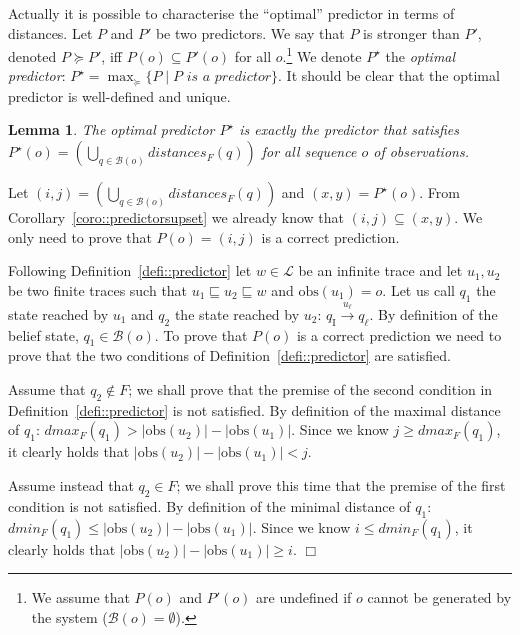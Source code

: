 \documentclass{article}
\newtheorem{lemm}{Lemma}
\newenvironment{proof}{\par\noindent{\bf Proof}}{\hspace{\stretch{1}}$\Box$}
\newcommand{\prefix}{\sqsubseteq}
\newcommand{\qi}[0]{q_{\mathrm{I}}}
\newcommand{\trans}[1]{\stackrel{#1}{\rightarrow}}
\newcommand{\lang}[0]{\mathcal{L}}
\newcommand{\obs}[0]{\mathrm{obs}}
\newcommand{\dmin}[1]{\mathit{dmin}_{#1}}
\newcommand{\dmax}[1]{\mathit{dmax}_{#1}}
\newcommand{\distances}{\mathit{distances}_F}
\newcommand{\belief}{\mathcal{B}}
\newcommand{\optimal}[1]{{#1}^\star}
\newcommand{\optipred}{\optimal{P}}
\newcommand{\set}[1]{\{#1\}}
\begin{document}
Actually it is possible to characterise 
the ``optimal'' predictor in terms of distances.  
Let $P$ and $P'$ be two predictors.  
We say that $P$ is stronger than $P'$, denoted $P \succeq P'$, 
iff $P(o) \subseteq P'(o)$ for all $o$.\footnote{We assume that $P(o)$ and $P'(o)$ 
are undefined if $o$ cannot be generated by the system 
($\belief(o) = \emptyset$).}
We denote $\optipred$ the \emph{optimal predictor}: 
$\optipred = \max_\succeq \set{P \mid P \textit{ is a predictor}}$.  
It should be clear that the optimal predictor is well-defined and unique.  

\begin{lemm}\label{lemm::defopti}
  The optimal predictor $\optipred$ 
  is exactly the predictor that satisfies $\optipred(o) = 
  \left(\bigcup_{q \in \belief(o)} \distances(q) \right)$ 
  for all sequence $o$ of observations.  
\end{lemm}

\begin{proof}
  Let $(i,j) = \left(\bigcup_{q \in \belief(o)} \distances(q) \right)$ 
  and $(x,y) = \optipred(o)$.  
  From Corollary~\ref{coro::predictorsupset} 
  we already know that $(i,j) \subseteq (x,y)$.  
  We only need to prove that $P(o) = (i,j)$ 
  is a correct prediction.  

  Following Definition~\ref{defi::predictor} 
  let $w \in \lang$ be an infinite trace 
  and let $u_1,u_2$ be two finite traces 
  such that $u_1 \prefix u_2 \prefix w$ and $\obs(u_1) = o$.  
  Let us call $q_1$ the state reached by $u_1$ 
  and $q_2$ the state reached by $u_2$: 
  $\qi \trans{u_\ell} q_\ell$.  
  By definition of the belief state, $q_1 \in \belief(o)$.  
  To prove that $P(o)$ is a correct prediction 
  we need to prove that the two conditions 
  of Definition~\ref{defi::predictor} are satisfied.  

  Assume that $q_2 \not\in F$; 
  we shall prove that the premise of the second condition 
  in Definition~\ref{defi::predictor} is not satisfied.  
  By definition of the maximal distance of $q_1$: 
  $\dmax{F}(q_1) > |\obs(u_2)| - |\obs(u_1)|$.  
  Since we know $j \ge \dmax{F}(q_1)$, it clearly holds 
  that $|\obs(u_2)| - |\obs(u_1)| < j$.  

  Assume instead that $q_2 \in F$; 
  we shall prove this time 
  that the premise of the first condition is not satisfied.  
  By definition of the minimal distance of $q_1$: 
  $\dmin{F}(q_1) \le |\obs(u_2)| - |\obs(u_1)|$.  
  Since we know $i \le \dmin{F}(q_1)$, it clearly holds 
  that $|\obs(u_2)| - |\obs(u_1)| \ge i$.  
\end{proof}
\end{document}
